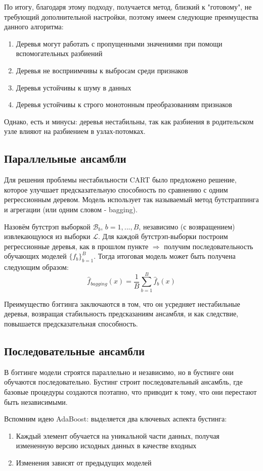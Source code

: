По итогу, благодаря этому подходу, получается метод, близкий к "готовому", не требующий дополнительной настройки, поэтому имеем следующие преимущества данного алгоритма:
\begin{enumerate}
    \item Деревья могут работать с пропущенными значениями при помощи вспомогательных разбиений
    \item Деревья не восприимчивы к выбросам среди признаков
    \item Деревья устойчивы к шуму в данных
    \item Деревья устойчивы к строго монотонным преобразованиям признаков
\end{enumerate}

Однако, есть и минусы: деревья нестабильны, так как разбиения в родительском узле влияют на разбиением в узлах-потомках.

\subsection*{Параллельные ансамбли}
Для решения проблемы нестабильности CART было предложено решение, которое улучшает предсказательную способность по сравнению с одним регрессионным деревом. Модель использует так называемый метод бутстраппинга и агрегации (или одним словом - bagging). 

Назовём бутстрэп выборкой $\mathcal{B}_b$, $b=1,...,B$, независимо (с возвращением) извлекающуюся из выборки $\mathcal{L}$. Для каждой бутстрэп-выборки построим регрессионные деревья, как в прошлом пункте $\Rightarrow$ получим последовательность обучающих моделей $\{f_b\}_{b=1}^B$. Тогда итоговая модель может быть получена следующим образом:
$$\hat{f}_{bagging}(x) = \frac{1}{B}\sum_{b=1}^B \hat{f}_b(x)$$

Преимущество бэггинга заключаются в том, что он усредняет нестабильные деревья, возвращая стабильность предсказаниям ансамбля, и как следствие, повышается предсказательная способность.

\subsection*{Последовательные ансамбли}
В бэггинге модели строятся параллельно и независимо, но в бустинге они обучаются последовательно. Бустинг строит последовательный ансамбль, где базовые процедуры создаются поэтапно, что приводит к тому, что они перестают быть независимыми.

Вспомним идею AdaBoost: выделяется два ключевых аспекта бустинга:
\begin{enumerate}
    \item Каждый элемент обучается на уникальной части данных, получая измененную версию исходных данных в качестве входных 
    \item Изменения зависят от предыдущих моделей
\end{enumerate}

